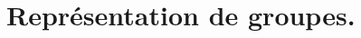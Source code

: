 \documentclass[./main]{subfiles}
\begin{document}
  \chapter{Représentation de groupes.}
  \minitoc
\end{document}
